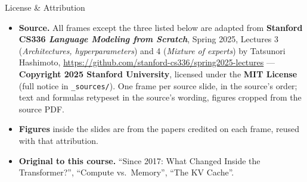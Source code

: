 \begin{frame}{License \& Attribution}
\begin{itemize}
\item \textbf{Source.} All frames except the three listed below are adapted from \textbf{Stanford CS336 \emph{Language Modeling from Scratch}}, Spring 2025, Lectures 3 (\emph{Architectures, hyperparameters}) and 4 (\emph{Mixture of experts}) by Tatsunori Hashimoto, \url{https://github.com/stanford-cs336/spring2025-lectures} --- \textbf{Copyright 2025 Stanford University}, licensed under the \textbf{MIT License} (full notice in \texttt{\_sources/}). One frame per source slide, in the source's order; text and formulas retypeset in the source's wording, figures cropped from the source PDF.
\item \textbf{Figures} inside the slides are from the papers credited on each frame, reused with that attribution.
\item \textbf{Original to this course.} \enquote{Since 2017: What Changed Inside the Transformer?}, \enquote{Compute vs.\ Memory}, \enquote{The KV Cache}.
\end{itemize}
\end{frame}

\endlecture

